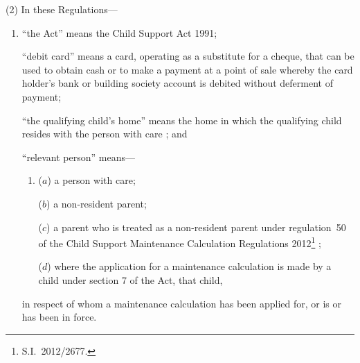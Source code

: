 \documentclass[12pt,a4paper]{article}
\begin{document}
(2) In these Regulations—
\begin{enumerate}\item[]
“the Act” means the Child Support Act 1991;

“debit card” means a card, operating as a substitute for a cheque, that can be used to obtain cash or to make a payment at a point of sale whereby the card holder’s bank or building society account is debited without deferment of payment;


“the qualifying child’s home” means the home in which the qualifying child resides with the person with care%
; and

“relevant person” means—
\begin{enumerate}\item[]
($a$) 
a person with care;

($b$) 
a non-resident parent;

($c$) 
a parent who is treated as a non-resident parent under 
regulation~50 of the Child Support Maintenance Calculation Regulations 2012\footnote{S.I.~2012/2677.}%
;

($d$) 
where the application for a maintenance calculation is made by a child under section 7 of the Act, that child,
\end{enumerate}
in respect of whom a maintenance calculation has been applied for, 
or is or has been in force.
\end{enumerate}

\end{document}
